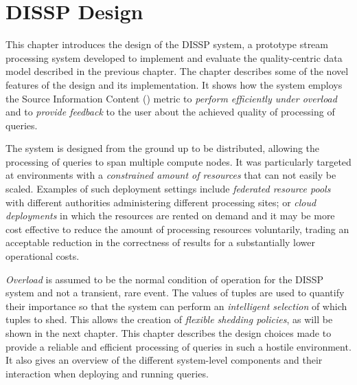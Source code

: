 \chapter{DISSP Design}
\label{ch:system_design}

This chapter introduces the design of the DISSP system, a prototype stream processing system developed to
implement and evaluate the quality-centric data model described in the previous chapter. 
The chapter describes some of the novel features of the design and its implementation.
It shows how the system employs the Source Information Content (\sic) metric to \emph{perform efficiently
under overload} and to \emph{provide feedback} to the user about the achieved quality of processing of
queries.

The system is designed from the ground up to be distributed, allowing the processing of queries to
span multiple compute nodes.
It was particularly targeted at environments with a \emph{constrained amount of resources} that can not
easily be scaled. Examples of such deployment settings include \emph{federated resource
pools} with different authorities administering different processing sites; or \emph{cloud deployments}
in which the resources are rented on demand and it may be more cost effective to reduce the
amount of processing resources voluntarily, trading an acceptable reduction in the correctness of results
for a substantially lower operational costs. 

\emph{Overload} is assumed to be the normal condition of operation for the DISSP system and not a
transient, rare event. 
The \sic values of tuples are used to quantify their importance so that the system can perform an 
\emph{intelligent selection} of which tuples to shed. This allows the creation of \emph{flexible shedding
policies}, as will be shown in the next chapter.
This chapter describes the design choices made to provide a reliable and efficient
processing of queries in such a hostile environment.
It also gives an overview of the different system-level components and their interaction when deploying
and running queries. 















	



		

